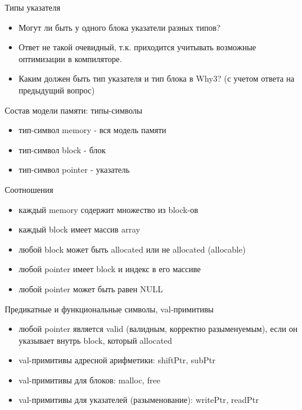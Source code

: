 \documentclass[hyperref={unicode=true}]{beamer}
\begin{document}
    \begin{frame}{Типы указателя}
    \begin{itemize}
    \item
    Могут ли быть у одного блока указатели
    разных типов?
    \item
    Ответ не такой очевидный, т.к. приходится
    учитывать возможные оптимизации в компиляторе.
    \item
    Каким должен быть тип указателя и тип блока
    в Why3? (с учетом ответа на предыдущий вопрос)
    \end{itemize}
    \end{frame}

    \begin{frame}{Состав модели памяти: типы-символы}
    \begin{itemize}
    \item
    тип-символ memory - вся модель памяти
    \item
    тип-символ block - блок
    \item
    тип-символ pointer - указатель
    \end{itemize}
    \end{frame}

    \begin{frame}{Соотношения}
    \begin{itemize}
    \item
    каждый memory содержит множество из block-ов
    \item
    каждый block имеет массив array
    \item
    любой block может быть allocated или не allocated (allocable)
    \item
    любой pointer имеет block и индекс в его массиве
    \item
    любой pointer может быть равен NULL
\iffalse
    \item
    любые два pointer из разных block-ов не сравнимы
\fi
    \end{itemize}
    \end{frame}

    \begin{frame}{Предикатные и функциональные символы, val-примитивы}
    \begin{itemize}
    \item
    любой pointer является valid (валидным, корректно разыменуемым), если
    он указывает внутрь block, который allocated
    \item
    val-примитивы адресной арифметики: shiftPtr, subPtr
    \item
    val-примитивы для блоков: malloc, free
    \item
    val-примитивы для указателей (разыменование): writePtr, readPtr
    \end{itemize}
    \end{frame}
\end{document}
